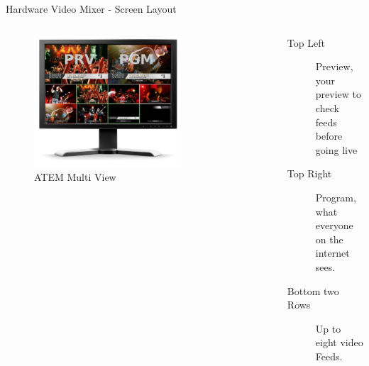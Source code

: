 \documentclass[aspectratio=169]{beamer}
\begin{document}
\begin{frame}{Hardware Video Mixer - Screen Layout}
	\begin{columns}[T,onlytextwidth]
	\begin{figure} 
		\centering
		\includegraphics[width=0.7\textwidth]{atem-multiview.png}
		\caption{ATEM Multi View}
		\label{fig:atem2}
	\end{figure}

	\begin{description}
		\item[Top Left] Preview, your preview to check feeds before going live 
		\item[Top Right] Program, what everyone on the internet sees.
		\item[Bottom two Rows] Up to eight video Feeds.
     \end{description}
	\end{columns}
\end{frame}
\end{document}
